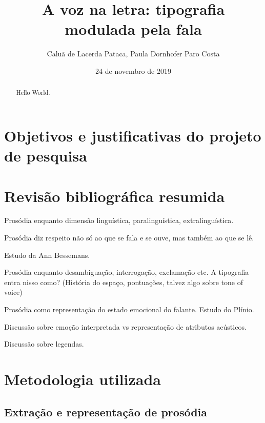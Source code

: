 \documentclass{tufte-handout}
\title{A voz na letra: tipografia modulada pela fala}
\author{Caluã de Lacerda Pataca, Paula Dornhofer Paro Costa}
\date{24 de novembro de 2019}  %
\begin{document}
\maketitle%

\begin{abstract}
\noindent Hello World.
\end{abstract}


\section{Objetivos e justificativas do projeto de pesquisa}\label{sec:objetivos}


\section{Revisão bibliográfica resumida}\label{sec:revisao_bibliografica}

Prosódia enquanto dimensão linguística, paralinguística, extralinguística.

Prosódia diz respeito não só ao que se fala e se ouve, mas também ao que se lê.

Estudo da Ann Bessemans.

Prosódia enquanto desambiguação, interrogação, exclamação etc. A tipografia entra nisso como? (História do espaço, pontuações, talvez algo sobre tone of voice)

Prosódia como representação do estado emocional do falante. Estudo do Plínio.

Discussão sobre emoção interpretada vs representação de atributos acústicos.

Discussão sobre legendas.

\section{Metodologia utilizada}\label{sec:metodologia}

\subsection{Extração e representação de prosódia}\label{sec:met_extract_represent}
\end{document}
